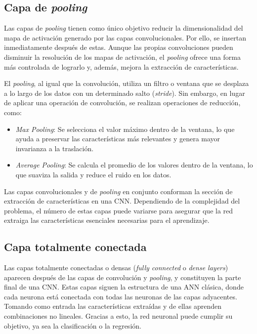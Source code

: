 \subsection{Capa de \textit{pooling}}

Las capas de \textit{pooling} tienen como único objetivo reducir la dimensionalidad del mapa de activación generado por las capas convolucionales. Por ello, se insertan inmediatamente después de estas. Aunque las propias convoluciones pueden disminuir la resolución de los mapas de activación, el \textit{pooling} ofrece una forma más controlada de lograrlo y, además, mejora la extracción de características.

El \textit{pooling}, al igual que la convolución, utiliza un filtro o ventana que se desplaza a lo largo de los datos con un determinado salto (\textit{stride}). Sin embargo, en lugar de aplicar una operación de convolución, se realizan operaciones de reducción, como:
\begin{itemize}
    \item \textit{Max Pooling}: Se selecciona el valor máximo dentro de la ventana, lo que ayuda a preservar las características más relevantes y genera mayor invarianza a la traslación.
    \item \textit{Average Pooling}: Se calcula el promedio de los valores dentro de la ventana, lo que suaviza la salida y reduce el ruido en los datos.
\end{itemize}

Las capas convolucionales y de \textit{pooling} en conjunto conforman la sección de extracción de características en una CNN. Dependiendo de la complejidad del problema, el número de estas capas puede variarse para asegurar que la red extraiga las características esenciales necesarias para el aprendizaje.

\subsection{Capa totalmente conectada}
Las capas totalmente conectadas o densas (\textit{fully connected} o \textit{dense layers}) aparecen después de las capas de convolución y \textit{pooling}, y constituyen la parte final de una CNN. Estas capas siguen la estructura de una ANN clásica, donde cada neurona está conectada con todas las neuronas de las capas adyacentes. Tomando como entrada las características extraídas y de ellas aprenden combinaciones no lineales. Gracias a esto, la red neuronal puede cumplir su objetivo, ya sea la clasificación o la regresión.

